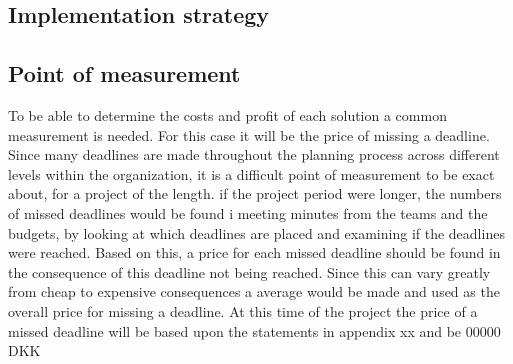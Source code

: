 \subsection{Implementation strategy}


\subsection{Point of measurement}
To be able to determine the costs and profit of each solution a common measurement is needed. For this case it will be the price of missing a deadline. Since many deadlines are made throughout the planning process across different levels within the organization, it is a difficult point of measurement to be exact about, for a project of the length. if the project period were longer, the numbers of missed deadlines would be found i meeting minutes from the teams and the budgets, by looking at which deadlines are placed and examining if the deadlines were reached. Based on this, a price for each missed deadline should be found in the consequence of this deadline not being reached. Since this can vary greatly from cheap to expensive consequences a average would be made and used as the overall price for missing a deadline. At this time of the project the price of a missed deadline will be based upon the statements in appendix xx and be 00000 DKK





